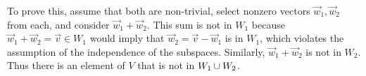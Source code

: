 \begin{exercises}
\begin{answer}
      To prove this, assume that both are non-trivial,
      select nonzero vectors \( \vec{w}_1, \vec{w}_2 \) from each,
      and consider \( \vec{w}_1+\vec{w}_2 \).
      This sum is not in \( W_1 \) because
      \( \vec{w}_1+\vec{w}_2=\vec{v}\in W_1 \) would imply that
      \( \vec{w}_2=\vec{v}-\vec{w}_1 \) is in \( W_1 \),
      which violates the assumption of the independence of the subspaces.
      Similarly, \( \vec{w}_1+\vec{w}_2 \) is not in \( W_2 \).
      Thus there is an element of \( V \) that is not in \( W_1\cup W_2 \).
     \end{answer}

\end{exercises}
